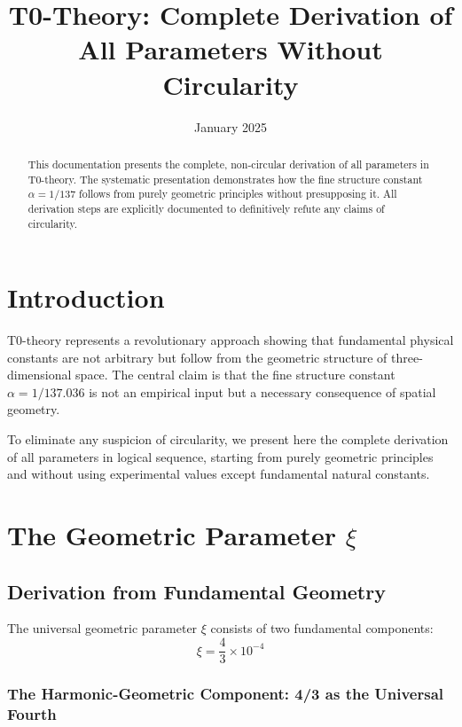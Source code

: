 \documentclass[12pt,a4paper]{report}
\author{}
\date{January 2025}
\begin{document}
\hfuzz=200pt
\allowdisplaybreaks

\title{T0-Theory: Complete Derivation of All Parameters Without Circularity}
\maketitle

\begin{abstract}
		This documentation presents the complete, non-circular derivation of all parameters in T0-theory. The systematic presentation demonstrates how the fine structure constant $\alpha = 1/137$ follows from purely geometric principles without presupposing it. All derivation steps are explicitly documented to definitively refute any claims of circularity.
	\end{abstract}

	\section{Introduction}
	
	T0-theory represents a revolutionary approach showing that fundamental physical constants are not arbitrary but follow from the geometric structure of three-dimensional space. The central claim is that the fine structure constant $\alpha = 1/137.036$ is not an empirical input but a necessary consequence of spatial geometry.
	
	To eliminate any suspicion of circularity, we present here the complete derivation of all parameters in logical sequence, starting from purely geometric principles and without using experimental values except fundamental natural constants.
\tableofcontents
\newpage	
\section{The Geometric Parameter $\xi$}

\subsection{Derivation from Fundamental Geometry}

The universal geometric parameter $\xi$ consists of two fundamental components:
\begin{equation}
	\xi = \frac{4}{3} \times 10^{-4}
\end{equation}

\subsubsection{The Harmonic-Geometric Component: 4/3 as the Universal Fourth}
\end{document}
